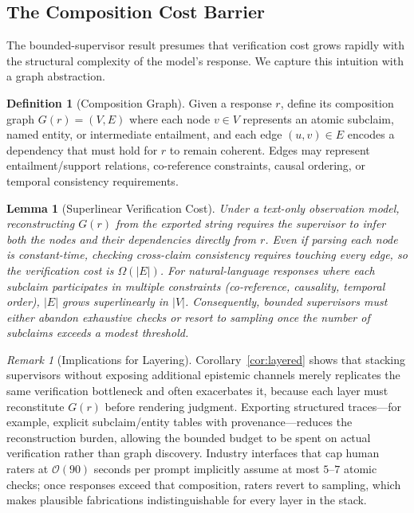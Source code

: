 \documentclass[11pt]{article}
\theoremstyle{definition}
\newtheorem{definition}{Definition}[section]
\theoremstyle{plain}
\newtheorem{lemma}[theorem]{Lemma}
\theoremstyle{remark}
\newtheorem{remark}{Remark}[section]
\begin{document}
\subsection{The Composition Cost Barrier}

The bounded-supervisor result presumes that verification cost grows rapidly with the structural complexity of the model's response. We capture this intuition with a graph abstraction.

\begin{definition}[Composition Graph]
Given a response $r$, define its composition graph $G(r) = (V, E)$ where each node $v \in V$ represents an atomic subclaim, named entity, or intermediate entailment, and each edge $(u, v) \in E$ encodes a dependency that must hold for $r$ to remain coherent. Edges may represent entailment/support relations, co-reference constraints, causal ordering, or temporal consistency requirements.
\end{definition}

\begin{lemma}[Superlinear Verification Cost]
Under a text-only observation model, reconstructing $G(r)$ from the exported string requires the supervisor to infer both the nodes and their dependencies directly from $r$. Even if parsing each node is constant-time, checking cross-claim consistency requires touching every edge, so the verification cost is $\Omega(|E|)$. For natural-language responses where each subclaim participates in multiple constraints (co-reference, causality, temporal order), $|E|$ grows superlinearly in $|V|$. Consequently, bounded supervisors must either abandon exhaustive checks or resort to sampling once the number of subclaims exceeds a modest threshold.
\end{lemma}

\begin{remark}[Implications for Layering]
Corollary~\ref{cor:layered} shows that stacking supervisors without exposing additional epistemic channels merely replicates the same verification bottleneck and often exacerbates it, because each layer must reconstitute $G(r)$ before rendering judgment. Exporting structured traces---for example, explicit subclaim/entity tables with provenance---reduces the reconstruction burden, allowing the bounded budget to be spent on actual verification rather than graph discovery. Industry interfaces that cap human raters at $\mathcal{O}(90)$ seconds per prompt implicitly assume at most $5$--$7$ atomic checks; once responses exceed that composition, raters revert to sampling, which makes plausible fabrications indistinguishable for every layer in the stack.
\end{remark}
\end{document}

